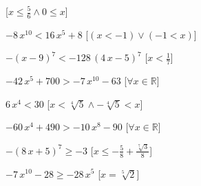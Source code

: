 \begin{esercizio}
\begin{enumeratea}
\hfill [$x\leq {\frac {5}{6}} \wedge 0\leq x$]
\item $-8\,{x}^{10}<16\,{x}^{5}+8$ 
\hfill [$(x<-1)\vee (-1<x)$]
\item $- \left( x-9 \right) ^{7}<-128\, \left( 4\,x-5 \right) ^{7}$ 
\hfill [$x<{\frac {1}{7}}$]
\item $-42\,{x}^{5}+700>-7\,{x}^{10}-63$ 
\hfill [$\forall x \in \mathbb{R}$]
\item $6\,{x}^{4}<30$ 
\hfill [$x<\sqrt [4]{5} \wedge -\sqrt [4]{5}<x$]
\item $-60\,{x}^{4}+490>-10\,{x}^{8}-90$ 
\hfill [$\forall x \in \mathbb{R}$]
\item $- \left( 8\,x+5 \right) ^{7}\geq -3$ 
\hfill [$x\leq -{\frac {5}{8}}+{\frac {\sqrt [7]{3}}{8}}$]
\item $-7\,{x}^{10}-28\geq -28\,{x}^{5}$ 
\hfill [$x=\sqrt [5]{2}$]
\end{enumeratea}
\end{esercizio}

